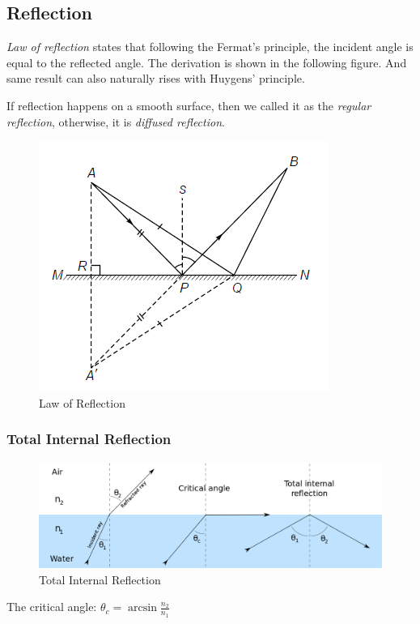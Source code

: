 \documentclass[UTF8]{book}
\begin{document}
\subsection{Reflection}
\emph{Law of reflection} states that following the Fermat's principle, the incident angle is equal to the reflected angle. The derivation is shown in the following figure. And same result can also naturally rises with Huygens' principle.

If reflection happens on a smooth surface, then we called it as the \emph{regular reflection}, otherwise, it is \emph{diffused reflection}.
\begin{figure}[H]
\centering
\label{fig:9}
\includegraphics[scale=1]{Figure/9.PNG}
\caption{Law of Reflection}
\end{figure}
\subsubsection{Total Internal Reflection}
\begin{figure}[H]
\centering
\label{fig:12}
\includegraphics[scale=0.2]{Figure/12.PNG}
\caption{Total Internal Reflection}
\end{figure}
The critical angle: $\theta _c=\arcsin \frac{n_2}{n_1}$
\end{document}
